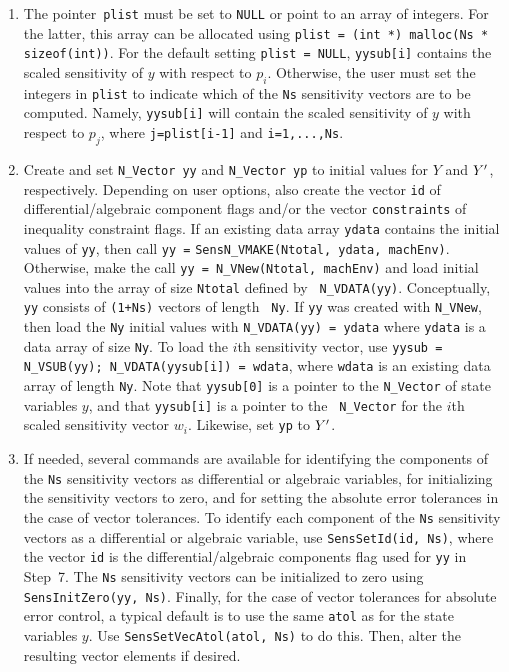 \begin{enumerate}
\item
The pointer~{\tt plist} must be set to {\tt NULL} or point to an array
of integers.
For the latter, this array can be allocated using {\tt plist = (int *)
malloc(Ns * sizeof(int))}.
For the default setting {\tt plist = NULL}, {\tt yysub[i]} contains
the scaled sensitivity of $y$ with respect to $p_i$.
Otherwise, the user must set the integers in {\tt plist} to indicate
which of the {\tt Ns} sensitivity vectors are to be computed.
Namely, {\tt yysub[i]} will contain the scaled sensitivity of $y$ with
respect to $p_j$, where {\tt j=plist[i-1]} and {\tt i=1,...,Ns}.

\item Create and set {\tt N\_Vector yy} and {\tt N\_Vector yp} to initial
values for $Y$ and $Y^{\prime}$, respectively.  
Depending on user options, also create the
vector {\tt id} of differential/algebraic component flags and/or the
vector {\tt constraints} of inequality constraint flags.
If an existing data array {\tt ydata} contains the initial values of
{\tt yy}, then call \newline
{\tt yy =} {\tt SensN\_VMAKE(Ntotal, ydata, machEnv)}.
Otherwise, make the call 
\newline
{\tt yy = N\_VNew(Ntotal, machEnv)} and load
initial values into the array of size {\tt Ntotal} defined by {\tt
N\_VDATA(yy)}. 
\newline
Conceptually, {\tt yy} consists of {\tt (1+Ns)} vectors of length {\tt
Ny}. 
If {\tt yy} was created with {\tt N\_VNew}, then load the {\tt Ny}
initial values with {\tt N\_VDATA(yy) = ydata} where {\tt ydata} is
a data array of size {\tt Ny}.
To load the $i$th sensitivity vector, use {\tt yysub =
N\_VSUB(yy); N\_VDATA(yysub[i]) = wdata}, where {\tt wdata} is an
existing data array of length {\tt Ny}.
Note that {\tt yysub[0]} is a pointer to the {\tt N\_Vector} of state
variables $y$, and that {\tt yysub[i]} is a pointer to the {\tt
N\_Vector} for the $i$th scaled sensitivity vector $w_i$.
Likewise, set {\tt yp} to $Y^{\prime}$.

\item
If needed, several commands are available for identifying the
components of the {\tt Ns} sensitivity vectors as differential or
algebraic variables, for initializing the sensitivity vectors to zero,
and for setting the absolute error tolerances in the case of vector
tolerances.
To identify each component of the {\tt Ns} sensitivity vectors as a
differential or algebraic variable, use {\tt SensSetId(id, Ns)}, where
the vector {\tt id} is the differential/algebraic components flag used
for {\tt yy} in Step~7.
The {\tt Ns} sensitivity vectors can be initialized to zero using {\tt
SensInitZero(yy, Ns)}.
Finally, for the case of vector tolerances for absolute error control,
a typical default is to use the same {\tt atol} as for the state
variables $y$.  
Use {\tt SensSetVecAtol(atol, Ns)} to do this.  
Then, alter the resulting vector elements if desired.


\end{enumerate}
